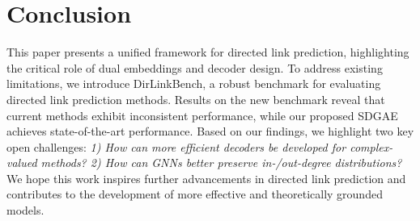 \section{Conclusion}  
This paper presents a unified framework for directed link prediction, highlighting the critical role of dual embeddings and decoder design. To address existing limitations, we introduce DirLinkBench, a robust benchmark for evaluating directed link prediction methods. Results on the new benchmark reveal that current methods exhibit inconsistent performance, while our proposed SDGAE achieves state-of-the-art performance. Based on our findings, we highlight two key open challenges: \textit{1) How can more efficient decoders be developed for complex-valued methods? 2) How can GNNs better preserve in-/out-degree distributions?} We hope this work inspires further advancements in directed link prediction and contributes to the development of more effective and theoretically grounded models.



